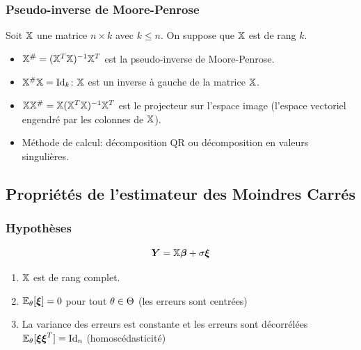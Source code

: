 \begin{frame}
\frametitle{Pseudo-inverse de Moore-Penrose}
Soit $\mathbb{X}$ une matrice $n \times k$ avec $ k \leq n$. On suppose que $\mathbb{X}$ est de rang $k$.
\begin{itemize}
\item $\mathbb{X}^{\#}= (\mathbb{X}^T \mathbb{X})^{-1} \mathbb{X}^T$ est la \alert{pseudo-inverse} de Moore-Penrose.
\item $\mathbb{X}^{\#} \mathbb{X}= \mathrm{Id}_{k} $: $\mathbb{X}$ est un inverse à gauche de la matrice $\mathbb{X}$.
\item  $\mathbb{X} \mathbb{X}^{\#} = \mathbb{X} (\mathbb{X}^T \mathbb{X})^{-1} \mathbb{X}^T$ est le projecteur sur l'espace image (l'espace vectoriel engendré par les colonnes de $\mathbb{X}$).
\item Méthode de calcul: décomposition QR ou décomposition en valeurs singulières.
\end{itemize}
\end{frame}

\subsection{Propriétés de l'estimateur des Moindres Carrés}

\begin{frame}
\frametitle{Hypothèses}
\[
\operatorname{\boldsymbol{Y}}= \mathbb{X} \boldsymbol{\beta} + \sigma \boldsymbol{\xi}
\]
\begin{enumerate}
\item \alert<1>{$\mathbb{X}$ est de rang complet.}
\item \alert<2>{$\operatorname{{\mathbb E}}_\theta[\boldsymbol{\xi}]= 0$ pour tout $\theta \in \Theta$  (les erreurs sont centrées)}
\item \alert<3>{La variance des erreurs est constante et les erreurs sont décorrélées $\operatorname{{\mathbb E}}_{\theta}[\boldsymbol{\xi} \boldsymbol{\xi}^T] = \mathrm{Id}_{n}$ (homoscédasticité)}
\end{enumerate}
\end{frame}

